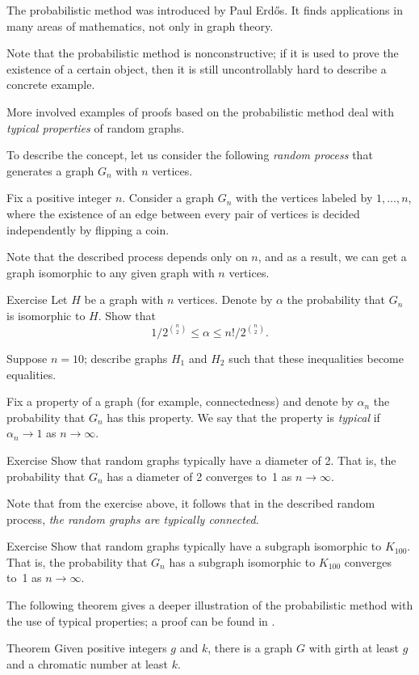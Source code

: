 The probabilistic method was introduced by Paul Erd\H os.
It finds applications in many areas of mathematics, not only in graph theory.

Note that the probabilistic method is nonconstructive;
if it is used to prove the existence of a certain object, then it is still uncontrollably hard to describe a concrete example.

More involved examples of proofs based on the probabilistic method deal with \textit{typical properties} of random graphs.

To describe the concept, let us consider the following \textit{random process} that generates a graph $G_n$ with $n$ vertices.

Fix a positive integer $n$. 
Consider a graph $G_n$ with the vertices labeled by $1,\dots,n$,
where the existence of an edge between every pair of vertices is decided independently by flipping a coin.

Note that the described process depends only on $n$, and as a result, we can get a graph isomorphic to any given graph with $n$ vertices.

\begin{thm}{Exercise}\label{ex:prob(isom)}
Let $H$ be a graph with $n$ vertices.
Denote by $\alpha$ the probability that $G_n$ is isomorphic to $H$.
Show that 
\[1/2^{\binom n2}\le \alpha\le n!/2^{\binom n2}.\]

Suppose $n=10$;
describe graphs $H_1$ and $H_2$ such that these inequalities become equalities.
\end{thm}


Fix a property of a graph (for example, connectedness)
and denote by $\alpha_n$ the probability that $G_n$ has this property.
We say that the property is \emph{typical} if $\alpha_n\to 1$ as $n\to \infty$.

\begin{thm}{Exercise}\label{ex:diam=2}
Show that random graphs typically have a diameter of 2.
That is, the probability that $G_n$ has a diameter of 2 converges to~1 as $n\to \infty$.
\end{thm}

Note that from the exercise above, it follows that in the described random process, \textit{the random graphs are typically connected}.

\begin{thm}{Exercise}\label{ex:typ(K100)}
Show that random graphs typically have a subgraph isomorphic to $K_{100}$.
That is, the probability that $G_n$ has a subgraph isomorphic to $K_{100}$ converges to~1 as $n\to \infty$.
\end{thm}

The following theorem gives a deeper illustration of the probabilistic method with the use of typical properties;
a proof can be found in \cite[Chapter 44]{aigner-ziegler}.

\begin{thm}{Theorem}
Given positive integers $g$ and $k$, there is a graph $G$ with girth at least $g$ and a chromatic number at least $k$. %
\end{thm}
